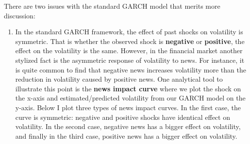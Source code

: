 \documentclass[]{book}
\providecommand{\tightlist}{%
  \setlength{\itemsep}{0pt}\setlength{\parskip}{0pt}}
\theoremstyle{definition}
\theoremstyle{definition}
\theoremstyle{definition}
\theoremstyle{remark}
\begin{document}
There are two issues with the standard GARCH model that merits more
discussion:

\begin{enumerate}
\def\labelenumi{\arabic{enumi}.}
\tightlist
\item
  In the standard GARCH framework, the effect of past shocks on
  volatility is symmetric. That is whether the observed shock is
  \textbf{negative} or \textbf{positive}, the effect on the volatility
  is the same. However, in the financial market another stylized fact is
  the asymmetric response of volatility to news. For instance, it is
  quite common to find that negative news increases volatility more than
  the reduction in volatility caused by positive news. One analytical
  tool to illustrate this point is the \textbf{news impact curve} where
  we plot the shock on the x-axis and estimated/predicted volatility
  from our GARCH model on the y-axis. Below I plot three types of news
  impact curves. In the first case, the curve is symmetric: negative and
  positive shocks have identical effect on volatility. In the second
  case, negative news has a bigger effect on volatility, and finally in
  the third case, positive news has a bigger effect on volatility.
\end{enumerate}
\end{document}
